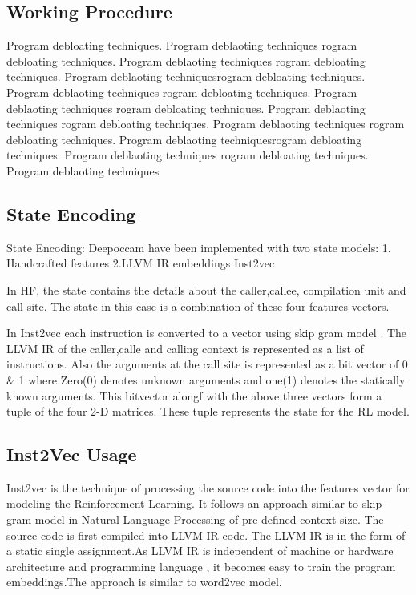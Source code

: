 \documentclass{relatorio}
\begin{document}
\subsection{Working Procedure}%
\label{Tools}

Program debloating techniques. Program deblaoting techniques rogram debloating techniques. Program deblaoting techniques
rogram debloating techniques. Program deblaoting techniquesrogram debloating techniques. Program deblaoting techniques
rogram debloating techniques. Program deblaoting techniques rogram debloating techniques. Program deblaoting techniques
rogram debloating techniques. Program deblaoting techniques 
rogram debloating techniques. Program deblaoting techniquesrogram debloating techniques. Program deblaoting techniques
rogram debloating techniques. Program deblaoting techniques

\subsection{State Encoding}%
\label{Tools}

	State Encoding:
Deepoccam have been implemented with two state models:
1. Handcrafted features
2.LLVM IR embeddings Inst2vec

In HF, the state contains the details about the caller,callee, compilation unit and call site. The state in this case is a combination of these four features vectors.

In Inst2vec each instruction is converted to a vector using skip gram model . The LLVM IR of the caller,calle and calling context is represented as a list of instructions. 
Also the arguments at the call site is represented as a bit vector of 0 \& 1 where Zero(0) denotes unknown arguments and one(1) denotes the statically known arguments.
This bitvector alongf with the above three vectors form a tuple of the four 2-D matrices. These tuple represents the state for the RL model. 


\subsection{Inst2Vec Usage}%
\label{Tools}

Inst2vec  is the technique of processing the source code into the features vector for modeling the Reinforcement Learning. It follows an approach similar to skip-gram model in Natural Language Processing of pre-defined context size. The source code is first compiled into LLVM IR code. The LLVM IR is in the form of a static single assignment.As LLVM IR  is independent of machine or hardware architecture and programming language , it becomes easy to train the program embeddings.The approach is similar to word2vec model.
\end{document}
